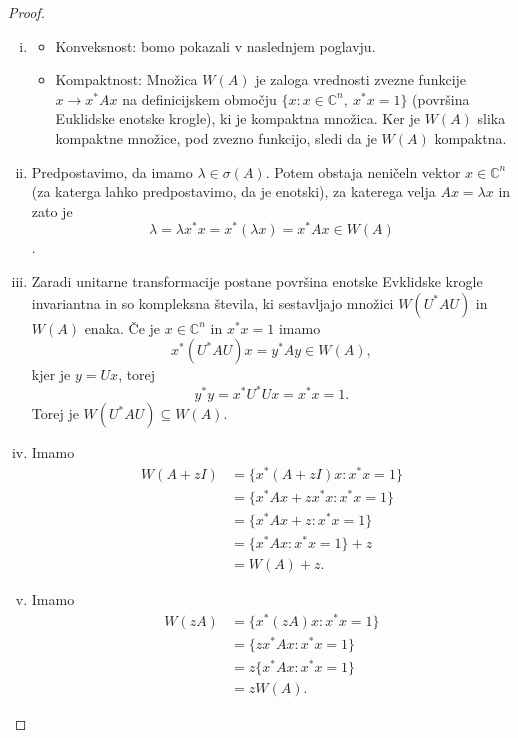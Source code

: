 \documentclass[12pt,a4paper]{amsart}
\theoremstyle{definition}
\theoremstyle{plain}
\newcommand{\C}{\mathbb C}
\begin{document}
\begin{proof}
\begin{enumerate}[(i)]
\item
\begin{itemize}
\item Konveksnost: bomo pokazali v naslednjem poglavju.
\item Kompaktnost: Množica $W(A)$ je zaloga vrednosti zvezne funkcije $x \rightarrow x^\ast Ax$ na definicijskem območju $\{x\! :x\in \C^n ,\ x^\ast x=1\}$ (površina Euklidske enotske krogle), ki je kompaktna množica. Ker je $W(A)$ slika kompaktne množice, pod zvezno funkcijo, sledi da je $W(A)$ kompaktna.
\end{itemize}
\item Predpostavimo, da imamo $\lambda \in \sigma(A)$. Potem obstaja neničeln vektor $x\in \C ^n$ (za katerga lahko predpostavimo, da je enotski), za katerega velja $Ax=\lambda x$ in zato je
$$\lambda = \lambda x^\ast x=x^\ast (\lambda x) = x^\ast Ax \in W(A)$$.
\item Zaradi unitarne transformacije postane površina enotske Evklidske krogle invariantna in so kompleksna števila, ki sestavljajo množici $W(U^\ast AU)$ in $W(A)$ enaka. 
Če je $x\in \C^n$ in $x^\ast x=1$ imamo $$x^\ast (U^\ast AU)x=y^\ast Ay \in W(A),$$ kjer je $y = Ux$, torej $$y^\ast y=x^\ast U^\ast Ux=x^\ast x=1.$$ Torej je $W(U^\ast AU)\subseteq W(A)$. 

\item Imamo 
\begin{align*}
W(A +zI)&=\{x^\ast (A+zI)x\! : x^\ast x=1\}\\
& = \{x^\ast Ax + zx^\ast x\! : x^\ast x =1\}\\
 &= \{x^\ast Ax + z\! : x^\ast x=1\} \\
&= \{x^\ast Ax\! : x^\ast x=1\} +z \\
&= W(A) +z.
\end{align*}
\item Imamo 
\begin{align*}
W(zA) &= \{x^\ast (zA)x\! : x^\ast x=1\}\\
& = \{zx^\ast Ax\! :x^\ast x =1\}\\
&= z\{x^\ast Ax\! :x^\ast x=1\}\\
& = zW(A).
\end{align*}


\end{enumerate}
\end{proof}
\end{document}
